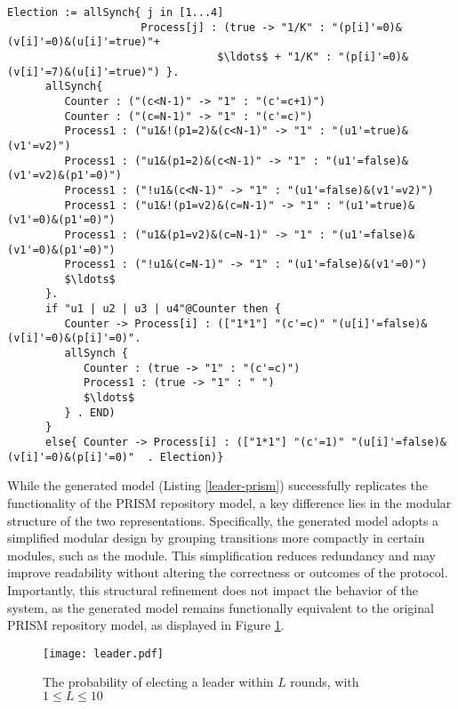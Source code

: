 \begin{lstlisting}[style=chor-color,caption={Choreography for the Synchronous Leader Election Protocol.},captionpos=b,label={leader-code}]
   Election := allSynch{ j in [1...4]
                     Process[j] : (true -> "1/K" : "(p[i]'=0)&(v[i]'=0)&(u[i]'=true)"+ 
                                 $\ldots$ + "1/K" : "(p[i]'=0)&(v[i]'=7)&(u[i]'=true)") }.
      allSynch{
         Counter : ("(c<N-1)" -> "1" : "(c'=c+1)")
         Counter : ("(c=N-1)" -> "1" : "(c'=c)")
         Process1 : ("u1&!(p1=2)&(c<N-1)" -> "1" : "(u1'=true)&(v1'=v2)")
         Process1 : ("u1&(p1=2)&(c<N-1)" -> "1" : "(u1'=false)&(v1'=v2)&(p1'=0)")
         Process1 : ("!u1&(c<N-1)" -> "1" : "(u1'=false)&(v1'=v2)")
         Process1 : ("u1&!(p1=v2)&(c=N-1)" -> "1" : "(u1'=true)&(v1'=0)&(p1'=0)")
         Process1 : ("u1&(p1=v2)&(c=N-1)" -> "1" : "(u1'=false)&(v1'=0)&(p1'=0)")
         Process1 : ("!u1&(c=N-1)" -> "1" : "(u1'=false)&(v1'=0)")
         $\ldots$
      }.
      if "u1 | u2 | u3 | u4"@Counter then {
         Counter -> Process[i] : (["1*1"] "(c'=c)" "(u[i]'=false)&(v[i]'=0)&(p[i]'=0)". 
         allSynch {
            Counter : (true -> "1" : "(c'=c)")
            Process1 : (true -> "1" : " ")
            $\ldots$               
         } . END)
      }
      else{ Counter -> Process[i] : (["1*1"] "(c'=1)" "(u[i]'=false)&(v[i]'=0)&(p[i]'=0)"  . Election)}      
   \end{lstlisting} 
   While the generated model (Listing \ref{leader-prism}) successfully replicates the functionality of 
   the PRISM repository model, a key difference lies in the modular 
   structure of the two representations. 
   Specifically, the generated model adopts a simplified modular design by 
   grouping transitions more compactly in certain modules, such as the  module. 
   This simplification reduces redundancy and may improve readability without altering the correctness or outcomes of the protocol. Importantly, this structural refinement does not impact the behavior of the system, as the generated model remains functionally equivalent to the original PRISM repository model, as displayed in Figure \ref{leader-res}.
   \begin{figure}[h]
      \centering
      \texttt{[image: leader.pdf]}	
      \caption{The probability of electing a leader within $L$ rounds, with $1 \leq L \leq 10$}
      \label{leader-res}
      \end{figure}
